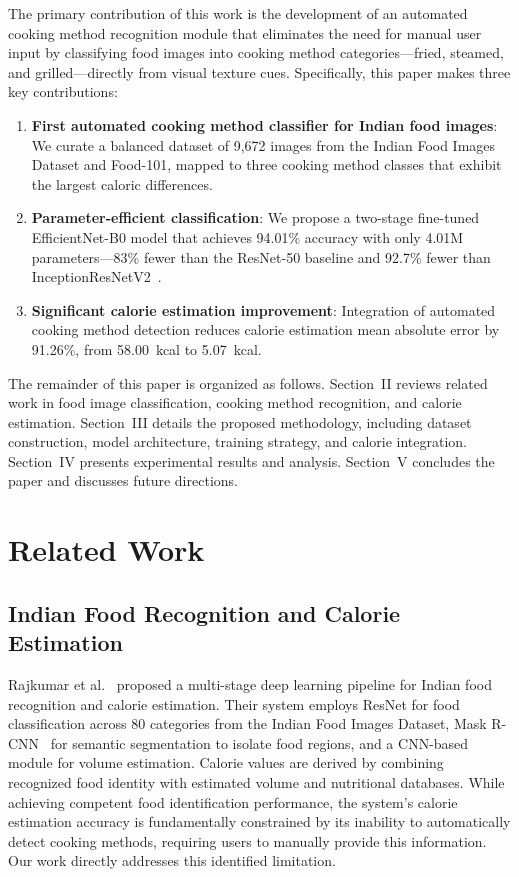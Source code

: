 \documentclass[journal]{IEEEtran}
\begin{document}
The primary contribution of this work is the development of an automated cooking method recognition module that eliminates the need for manual user input by classifying food images into cooking method categories---fried, steamed, and grilled---directly from visual texture cues. Specifically, this paper makes three key contributions:

\begin{enumerate}
    \item \textbf{First automated cooking method classifier for Indian food images}: We curate a balanced dataset of 9,672 images from the Indian Food Images Dataset and Food-101, mapped to three cooking method classes that exhibit the largest caloric differences.
    \item \textbf{Parameter-efficient classification}: We propose a two-stage fine-tuned EfficientNet-B0 model that achieves 94.01\% accuracy with only 4.01M parameters---83\% fewer than the ResNet-50 baseline and 92.7\% fewer than InceptionResNetV2~\cite{chun2022korean}.
    \item \textbf{Significant calorie estimation improvement}: Integration of automated cooking method detection reduces calorie estimation mean absolute error by 91.26\%, from 58.00~kcal to 5.07~kcal.
\end{enumerate}

The remainder of this paper is organized as follows. Section~II reviews related work in food image classification, cooking method recognition, and calorie estimation. Section~III details the proposed methodology, including dataset construction, model architecture, training strategy, and calorie integration. Section~IV presents experimental results and analysis. Section~V concludes the paper and discusses future directions.

\section{Related Work}

\subsection{Indian Food Recognition and Calorie Estimation}

Rajkumar et al.~\cite{rajkumar2024deep} proposed a multi-stage deep learning pipeline for Indian food recognition and calorie estimation. Their system employs ResNet for food classification across 80 categories from the Indian Food Images Dataset, Mask R-CNN~\cite{lin2017mask} for semantic segmentation to isolate food regions, and a CNN-based module for volume estimation. Calorie values are derived by combining recognized food identity with estimated volume and nutritional databases. While achieving competent food identification performance, the system's calorie estimation accuracy is fundamentally constrained by its inability to automatically detect cooking methods, requiring users to manually provide this information. Our work directly addresses this identified limitation.
\end{document}
